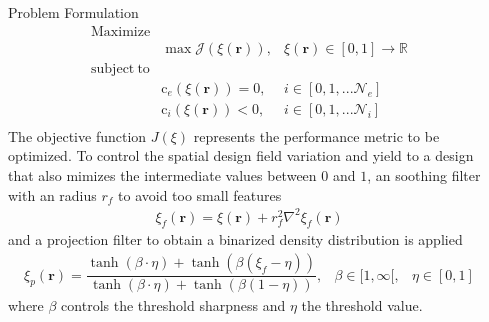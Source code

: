 \begin{frame}[t]
\begin{columns}[t]
\begin{column}{\colwidth}
\begin{block}{Problem Formulation}
     \begin{equation}
     \begin{aligned}
       \mathrm{Maximize} &  &\\
        & \max \mathcal{J}(\xi(\bm{r})), &\xi(\bm{r}) \in [0, 1] \rightarrow \mathbb{R}\\
        \mathrm{subject~to} &  &\\
        & \mathrm{c}_e(\xi(\bm{r})) = 0, & i \in [0, 1, ... \mathcal{N}_e]\\
        & \mathrm{c}_i(\xi(\bm{r})) < 0, & i \in [0, 1, ... \mathcal{N}_i]\\
    \end{aligned}
    \label{eq:objective_function}
    \end{equation}
    The objective function $\mathit{J}(\xi)$ represents the performance metric to be optimized. 
    To control the spatial design field variation and yield to a design that also mimizes the intermediate values between $0$ and $1$, an soothing filter with an radius $r_f$ to avoid too small features
    \begin{equation}
        \begin{aligned}
        \xi_f(\mathbf{r}) = \xi(\mathbf{r}) + r^2_f\nabla^2\xi_f(\mathbf{r})
        \end{aligned}
    \end{equation}
    and a projection filter to obtain a binarized density distribution is applied
\begin{equation}
    \begin{aligned}
        \xi_p(\mathbf{r}) = \dfrac{
        \tanh \left( {\beta \cdot \eta} \right)+ \tanh{ \left( \beta \left( \xi_f - \eta \right) \right) }
        }
        { \tanh{\left( \beta \cdot \eta \right)} + \tanh{\left( \beta \left( 1-\eta \right)\right)} },  & \beta \in [1, \infty[, & \eta \in [0, 1]
    \end{aligned}
\end{equation}
where $\beta$ controls the threshold sharpness and $\eta$ the threshold value.
  








    
    \end{block}   

\end{column}
\separatorcolumn
\begin{column}{\colwidth}
    

\end{column}
\end{columns}
\end{frame}
